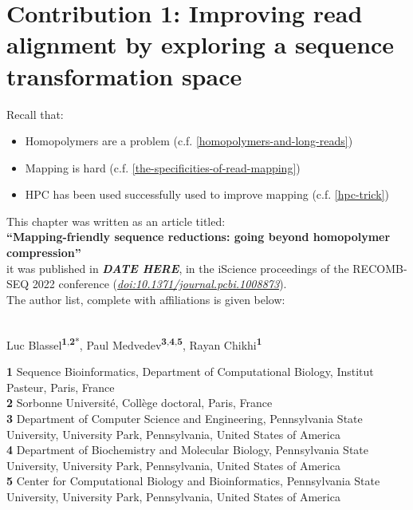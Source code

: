 \documentclass[
  11pt,
  twoside]{scrbook}
\begin{document}
\hypertarget{HPC-paper}{%
\chapter{Contribution 1: Improving read alignment by exploring a sequence transformation space}\label{HPC-paper}}

Recall that:

\begin{itemize}
\item
  Homopolymers are a problem (c.f. \ref{homopolymers-and-long-reads})
\item
  Mapping is hard (c.f. \ref{the-specificities-of-read-mapping})
\item
  HPC has been used successfully used to improve mapping (c.f. \ref{hpc-trick})
\end{itemize}

This chapter was written as an article titled:\\
\textbf{``Mapping-friendly sequence reductions: going beyond homopolymer compression''}\\
it was published in \textbf{\emph{DATE HERE}}, in the iScience proceedings of the RECOMB-SEQ 2022 conference (\href{https://doi.org/10.1371/journal.pcbi.1008873}{\emph{doi:10.1371/journal.pcbi.1008873}}).\\
The author list, complete with affiliations is given below:\\
\strut \\

Luc Blassel\textsuperscript{\textbf{1},\textbf{2}*}, Paul Medvedev\textsuperscript{\textbf{3},\textbf{4},\textbf{5}}, Rayan Chikhi\textsuperscript{\textbf{1}}

\textbf{1} Sequence Bioinformatics, Department of Computational Biology, Institut Pasteur, Paris, France\\
\textbf{2} Sorbonne Université, Collège doctoral, Paris, France\\
\textbf{3} Department of Computer Science and Engineering, Pennsylvania State University, University Park, Pennsylvania, United States of America\\
\textbf{4} Department of Biochemistry and Molecular Biology, Pennsylvania State University, University Park, Pennsylvania, United States of America\\
\textbf{5} Center for Computational Biology and Bioinformatics, Pennsylvania State University, University Park, Pennsylvania, United States of America\\
\strut \\
\end{document}
